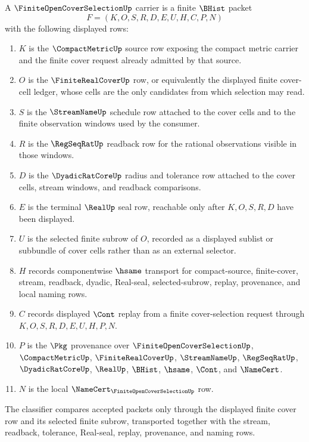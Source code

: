 \begin{definition}
\label{def:finite-open-cover-selection-carrier}
A $\FiniteOpenCoverSelectionUp$ carrier is a finite $\BHist$ packet
$$
F=(K,O,S,R,D,E,U,H,C,P,N)
$$
with the following displayed rows:
\begin{enumerate}
\item $K$ is the $\CompactMetricUp$ source row exposing the compact metric carrier and the finite cover request already admitted by that source.
\item $O$ is the $\FiniteRealCoverUp$ row, or equivalently the displayed finite cover-cell ledger, whose cells are the only candidates from which selection may read.
\item $S$ is the $\StreamNameUp$ schedule row attached to the cover cells and to the finite observation windows used by the consumer.
\item $R$ is the $\RegSeqRatUp$ readback row for the rational observations visible in those windows.
\item $D$ is the $\DyadicRatCoreUp$ radius and tolerance row attached to the cover cells, stream windows, and readback comparisons.
\item $E$ is the terminal $\RealUp$ seal row, reachable only after $K,O,S,R,D$ have been displayed.
\item $U$ is the selected finite subrow of $O$, recorded as a displayed sublist or subbundle of cover cells rather than as an external selector.
\item $H$ records componentwise $\hsame$ transport for compact-source, finite-cover, stream, readback, dyadic, Real-seal, selected-subrow, replay, provenance, and local naming rows.
\item $C$ records displayed $\Cont$ replay from a finite cover-selection request through $K,O,S,R,D,E,U,H,P,N$.
\item $P$ is the $\Pkg$ provenance over $\FiniteOpenCoverSelectionUp$, $\CompactMetricUp$, $\FiniteRealCoverUp$, $\StreamNameUp$, $\RegSeqRatUp$, $\DyadicRatCoreUp$, $\RealUp$, $\BHist$, $\hsame$, $\Cont$, and $\NameCert$.
\item $N$ is the local $\NameCert_{\FiniteOpenCoverSelectionUp}$ row.
\end{enumerate}
The classifier compares accepted packets only through the displayed finite cover row and its selected finite subrow, transported together with the stream, readback, tolerance, Real-seal, replay, provenance, and naming rows.
\end{definition}

